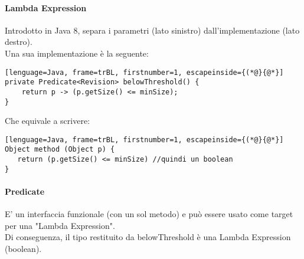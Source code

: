 \documentclass{article}
\begin{document}
\paragraph{Lambda Expression}
Introdotto in Java 8, separa i parametri (lato sinistro) dall'implementazione (lato destro).\\
Una sua implementazione è la seguente:
\begin{lstlisting}[lenguage=Java, frame=trBL, firstnumber=1, escapeinside={(*@}{@*}]
private Predicate<Revision> belowThreshold() {
    return p -> (p.getSize() <= minSize);
}
\end{lstlisting}
Che equivale a scrivere:
\begin{lstlisting}[lenguage=Java, frame=trBL, firstnumber=1, escapeinside={(*@}{@*}]
Object method (Object p) {
   return (p.getSize() <= minSize) //quindi un boolean
}
\end{lstlisting}
\paragraph{Predicate} 
E' un interfaccia funzionale (con un sol metodo) e può essere usato come target per una "Lambda Expression".\\
Di conseguenza, il tipo restituito da belowThreshold è una Lambda Expression (boolean).
\end{document}
